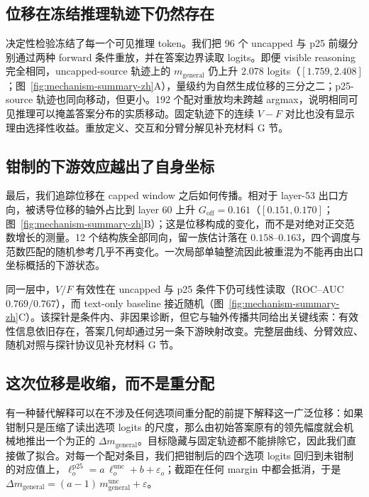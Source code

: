 \documentclass[UTF8,letterpaper,10pt,twocolumn]{ctexart}
\begin{document}
\subsection{位移在冻结推理轨迹下仍然存在}

决定性检验冻结了每一个可见推理 token。我们把 96 个 uncapped 与 p25 前缀分别通过两种 forward 条件重放，并在答案边界读取 logits。即便 visible reasoning 完全相同，uncapped-source 轨迹上的 $m_{\mathrm{general}}$ 仍上升 $2.078$ logits（$[1.759,2.408]$；图~\ref{fig:mechanism-summary-zh}A），量级约为自然生成位移的三分之二；p25-source 轨迹也同向移动，但更小。192 个配对重放均未跨越 argmax，说明相同可见推理可以掩盖答案分布的实质移动。固定轨迹下的连续 $V-F$ 对比也没有显示理由选择性收益。重放定义、交互和分臂分解见补充材料 G 节。

\subsection{钳制的下游效应越出了自身坐标}

最后，我们追踪位移在 capped window 之后如何传播。相对于 layer-53 出口方向，被诱导位移的轴外占比到 layer 60 上升 $G_{\mathrm{off}}=0.161$（$[0.151,0.170]$；图~\ref{fig:mechanism-summary-zh}B）；这是位移构成的变化，而不是对绝对正交范数增长的测量。12 个结构族全部同向，留一族估计落在 $0.158$--$0.163$，四个调度与范数匹配的随机参考几乎不再变化。一次局部单轴整流因此被重混为不能再由出口坐标概括的下游状态。

同一层中，$V/F$ 有效性在 uncapped 与 p25 条件下仍可线性读取（ROC--AUC $0.769/0.767$），而 text-only baseline 接近随机（图~\ref{fig:mechanism-summary-zh}C）。该探针是条件内、非因果诊断，但它与轴外传播共同给出关键线索：有效性信息依旧存在，答案几何却通过另一条下游映射改变。完整层曲线、分臂效应、随机对照与探针协议见补充材料 G 节。

\subsection{这次位移是收缩，而不是重分配}
\label{sec:contraction-zh}

有一种替代解释可以在不涉及任何选项间重分配的前提下解释这一广泛位移：如果钳制只是压缩了读出选项 logits 的尺度，那么由初始答案原有的领先幅度就会机械地推出一个为正的 $\Delta m_{\mathrm{general}}$。目标隐藏与固定轨迹都不能排除它，因此我们直接做了拟合。对每一个配对条目，我们把钳制后的四个选项 logits 回归到未钳制的对应值上，$\ell^{\mathrm{p25}}_{o}=a\,\ell^{\mathrm{unc}}_{o}+b+\varepsilon_{o}$；截距在任何 margin 中都会抵消，于是 $\Delta m_{\mathrm{general}}=(a-1)\,m^{\mathrm{unc}}_{\mathrm{general}}+\varepsilon$。
\end{document}
